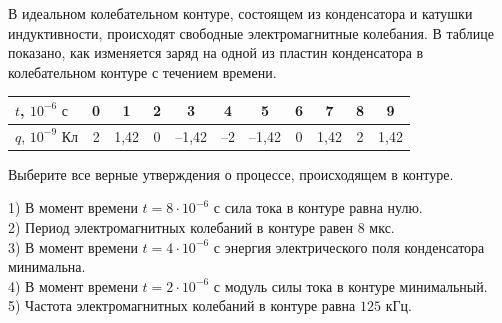 \begin{taskbasic}[code={\label{task:elem_osc_v4_n14}}]
В идеальном колебательном контуре, состоящем из конденсатора и катушки индуктивности, происходят свободные электромагнитные колебания. В таблице показано, как изменяется заряд на одной из пластин конденсатора в колебательном контуре с течением времени.

\nopagebreak\smallskip
\begin{center}
\small
\begin{tabular}{|l|c|c|c|c|c|c|c|c|c|c|}
\hline
$t$, $10^{-6}\text{ с}$ & 0 & 1 & 2 & 3 & 4 & 5 & 6 & 7 & 8 & 9 \\ \hline
$q$, $10^{-9}\text{ Кл}$ & 2 & 1,42 & 0 & --1,42 & --2 & --1,42 & 0 & 1,42 & 2 & 1,42 \\ \hline
\end{tabular}
\end{center}
\smallskip

Выберите все верные утверждения о процессе, происходящем в контуре.

1) В момент времени $t = 8\cdot 10^{-6}\text{ с}$ сила тока в контуре равна нулю.\\
2) Период электромагнитных колебаний в контуре равен $8\text{ мкс}$.\\
3) В момент времени $t = 4\cdot 10^{-6}\text{ с}$ энергия электрического поля конденсатора минимальна.\\
4) В момент времени $t = 2\cdot 10^{-6}\text{ с}$ модуль силы тока в контуре минимальный.\\
5) Частота электромагнитных колебаний в контуре равна $125\text{ кГц}$.

\end{taskbasic}

